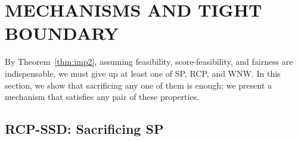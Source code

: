 \documentclass[a4paper,twoside]{article}
\theoremstyle{definition}
\newcommand{\zh}[1]{\textcolor{red}{\textbf{Zhaohong says:} #1}}
\begin{document}
\section{\uppercase{Mechanisms and Tight Boundary}}
\label{sec:boundary}
By Theorem~\ref{thm:imp2}, assuming feasibility, score-feasibility, and fairness are
indispensable, we must give up at least one of SP, RCP, and WNW.
In this section, we show that sacrificing any one of them is enough;
we present a mechanism that satisfies any pair of these properties. 

\subsection{RCP-SSD: Sacrificing SP}

\end{document}
